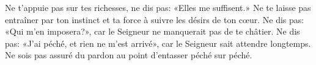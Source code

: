 Ne t’appuie pas sur tes richesses, ne dis pas: «Elles me suffisent.»
Ne te laisse pas entraîner par ton instinct et ta force à suivre les désirs de ton cœur.
Ne dis pas: «Qui m’en imposera?»,
	car le Seigneur ne manquerait pas de te châtier.
Ne dis pas: «J’ai péché, et rien ne m’est arrivé»,
	car le Seigneur sait attendre longtemps.
Ne sois pas assuré du pardon au point d’entasser péché sur péché.
